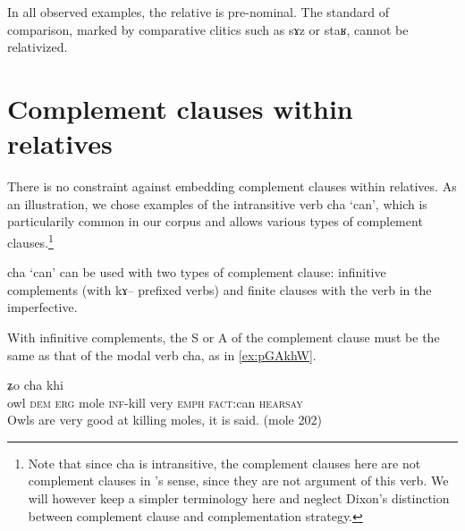 \documentclass[oldfontcommands,oneside,a4paper,11pt]{article}
\newcommand{\ipa}[1]{{\phon #1}} %
\newcommand{\topic}{\textsc{dem}}
\begin{document}
   In all observed examples, the relative is pre-nominal. 
The standard of comparison, marked by comparative clitics such as \ipa{sɤz} or \ipa{staʁ}, cannot be relativized. 

 

  

\section{Complement clauses within relatives}

There is no constraint against embedding complement clauses within relatives. As an illustration, we chose examples of the intransitive verb \ipa{cha} `can', which is particularily common in our corpus and allows various types of complement clauses.\footnote{Note that since \ipa{cha} is intransitive, the complement clauses here are not complement clauses in  \citet{dixon06complementation}'s sense, since they are not argument of this verb. We will however keep a simpler terminology here and neglect Dixon's distinction between complement clause and complementation strategy.
}

\ipa{cha} `can' can be used with two types of complement clause: infinitive complements (with \ipa{kɤ--} prefixed verbs) and  finite clauses with the verb in the imperfective.
 
 With infinitive complements, the S or A of the complement clause must be the same as that of the modal verb \ipa{cha}, as in \ref{ex:pGAkhW}.
 
 \begin{exe}
   \ex   \label{ex:pGAkhW}  
\gll
[\ipa{pɣɤkʰɯ} 	\ipa{nɯ} 	\ipa{kɯ} 	\ipa{qaɲi} 	\ipa{kɤ-sat}] 	\ipa{wuma} 	\ipa{ʑo} 	\ipa{cha} 	\ipa{khi}  \\
owl \topic{} \textsc{erg} mole \textsc{inf}-kill very \textsc{emph} \textsc{fact}:can \textsc{hearsay} \\
\glt Owls are very good at killing moles, it is said. (mole 202)
   \end{exe} 
\end{document}
